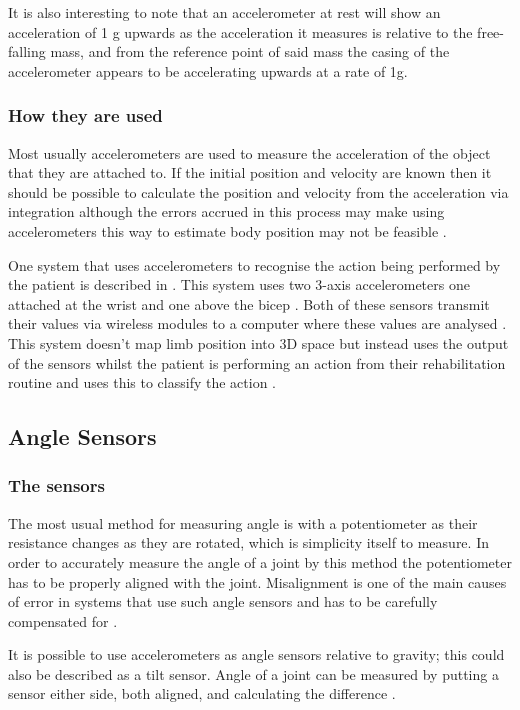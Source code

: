 \documentclass[journal]{IEEEtran}
\begin{document}
It is also interesting to note that an accelerometer at rest will show an acceleration of 1 g upwards as 
the acceleration it measures is relative to the free-falling mass, and from the reference point of said 
mass the casing of the accelerometer appears to be accelerating upwards at a rate of 1g.

\subsubsection{How they are used}
Most usually accelerometers are used to measure the acceleration of the object that they are attached to. 
If the initial position and velocity are known then it should be possible to calculate the position and velocity 
from the acceleration via integration although the errors accrued in this process may make using accelerometers 
this way to estimate body position may not be feasible \cite{ACfeasable}.

One system that uses accelerometers to recognise the action being performed by the patient 
is described in \cite{ACSVM}. This system uses two 3-axis accelerometers 
one attached at the wrist and one above the bicep \cite{ACSVM}. Both of these sensors transmit their 
values via wireless modules to a computer where these values are analysed \cite{ACSVM}. This system 
doesn't map limb position into 3D space but instead uses the output of the sensors whilst the 
patient is performing an action from their rehabilitation routine and uses this to classify the 
action \cite{ACSVM}.

\subsection{Angle Sensors} 
\subsubsection{The sensors}
The most usual method for measuring angle is with a potentiometer as their resistance changes as 
they are rotated, which is simplicity itself to measure. In order to accurately measure the angle of 
a joint by this method the potentiometer has to be properly aligned with the joint. Misalignment is 
one of the main causes of error in systems that use such angle sensors and has to be carefully 
compensated for \cite{AdvancesPush}.

It is possible to use accelerometers as angle sensors relative to gravity; this could also be described 
as a tilt sensor. Angle of a joint can be measured by putting a sensor either side, both aligned, and 
calculating the difference \cite{ACangle}.
\end{document}
